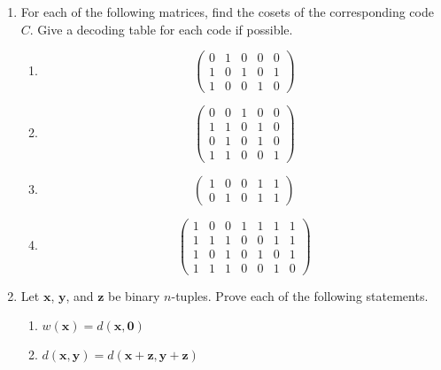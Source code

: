 {\begin{enumerate}
 
\item
For each of the following matrices, find the cosets of the
corresponding code $C$. Give a decoding table for each code if
possible. 
\begin{multicols}{2}
\begin{enumerate}

\item
\[
\begin{pmatrix}
0 & 1 & 0 & 0 & 0 \\
1 & 0 & 1 & 0 & 1 \\
1 & 0 & 0 & 1 & 0
\end{pmatrix}
\]

\item
\[
\begin{pmatrix}
0 & 0 & 1 & 0 & 0  \\
1 & 1 & 0 & 1 & 0 \\
0 & 1 & 0 & 1 & 0 \\
1 & 1 & 0 & 0 & 1
\end{pmatrix}
\]

\item
\[
\begin{pmatrix}
1 & 0 & 0 & 1 & 1 \\
0 & 1 & 0 & 1 & 1
\end{pmatrix}
\]

\item
\[
\begin{pmatrix}
1 & 0 & 0 & 1 & 1 & 1 & 1 \\
1 & 1 & 1 & 0 & 0 & 1 & 1 \\
1 & 0 & 1 & 0 & 1 & 0 & 1 \\
1 & 1 & 1 & 0 & 0 & 1 & 0
\end{pmatrix}
\]

\end{enumerate}
\end{multicols}
 
 

 
 
 
\item
Let ${\mathbf x}$, ${\mathbf y}$, and ${\mathbf z}$ be binary $n$-tuples.
Prove each of the following statements. 
\begin{enumerate}
 
 \item
$w({\mathbf x}) = d( {\mathbf x}, {\mathbf 0})$
 
 \item
$d( {\mathbf x}, {\mathbf y}) = d( {\mathbf x} + {\mathbf z}, {\mathbf
y} + {\mathbf z} )$
 

\end{enumerate}
\end{enumerate}}
